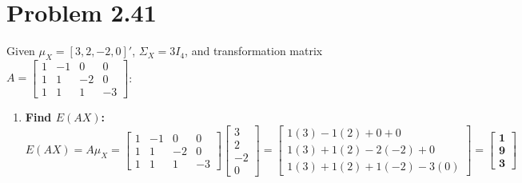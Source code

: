 \documentclass[11pt,letterpaper]{article}
\begin{document}
\section*{Problem 2.41}
Given $\mu_X = [3, 2, -2, 0]'$, $\Sigma_X = 3I_4$, and transformation matrix $A = \begin{bmatrix} 1 & -1 & 0 & 0 \\ 1 & 1 & -2 & 0 \\ 1 & 1 & 1 & -3 \end{bmatrix}$:
\begin{enumerate}
    \item[(a)] \textbf{Find $E(AX)$:} 
    $$E(AX) = A \mu_X = \begin{bmatrix} 1 & -1 & 0 & 0 \\ 1 & 1 & -2 & 0 \\ 1 & 1 & 1 & -3 \end{bmatrix} \begin{bmatrix} 3 \\ 2 \\ -2 \\ 0 \end{bmatrix} = \begin{bmatrix} 1(3) - 1(2) + 0 + 0 \\ 1(3) + 1(2) - 2(-2) + 0 \\ 1(3) + 1(2) + 1(-2) - 3(0) \end{bmatrix} = \mathbf{\begin{bmatrix} 1 \\ 9 \\ 3 \end{bmatrix}}$$
    

\end{enumerate}
\end{document}

